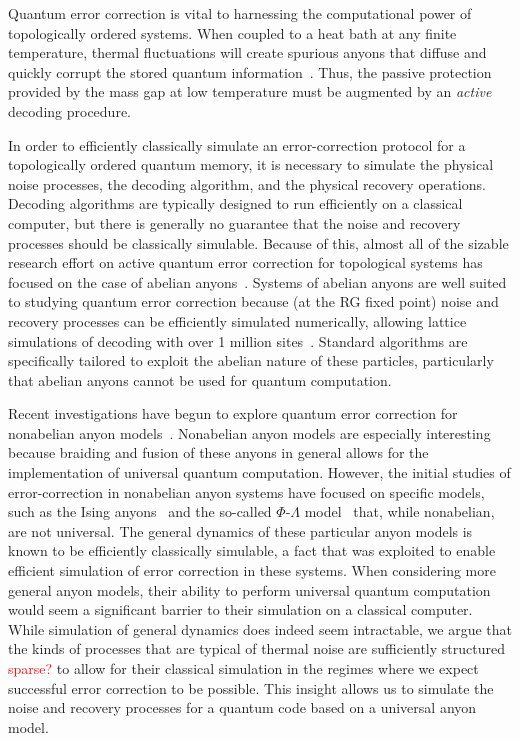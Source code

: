 \documentclass[aps, prl, letterpaper, twocolumn, superscriptaddress, notitlepage, 10pt]{revtex4}
\newcommand{\dude}[1]{\textcolor{red}{#1}}
\begin{document}
Quantum error correction is vital to harnessing the computational power of topologically 
ordered systems. When coupled to a heat bath at any finite temperature, thermal fluctuations 
will create spurious anyons that diffuse and quickly corrupt the stored quantum 
information~\cite{Pastawski2010}. Thus, the passive protection provided by the mass gap 
at low temperature must be augmented by an \emph{active} decoding procedure. 

In order to efficiently classically simulate an error-correction protocol for 
a topologically ordered quantum memory, it is necessary to simulate 
the physical noise processes, the decoding algorithm, and the physical recovery operations. 
Decoding algorithms are typically designed to run efficiently on a 
classical computer, but there is generally no guarantee that the 
noise and recovery processes should be classically simulable.
Because of this, almost all of the sizable research effort 
on active quantum error correction for topological systems has focused 
on the case of abelian anyons~\cite{Dennis2002, Duclos-Cianci2010, Duclos-Cianci2010a, Wang2010, Wang2010a, Duclos-Cianci2013, Bravyi2011, Bombin2012, Wootton2012, Anwar2014, Watson2014, Hutter2014a, Bravyi2014, Wootton2015, Fowler2015, Andrist2015}.
Systems of abelian anyons are well suited to studying quantum 
error correction because (at the RG fixed point) noise and 
recovery processes can be efficiently simulated numerically, allowing lattice simulations 
of decoding with over 1 million sites~\cite{Duclos-Cianci2010}. 
Standard algorithms are specifically tailored to exploit the abelian nature 
of these particles, particularly that abelian anyons cannot be used for quantum computation. 

Recent investigations have begun to explore quantum error correction for nonabelian anyon 
models~\cite{Brell2013, Wootton2013, Hutter2014, Wootton2015b}. Nonabelian anyon models are especially interesting 
because braiding and fusion of these anyons in general allows for the implementation of universal quantum 
computation. However, the initial studies of error-correction in nonabelian anyon systems have focused on specific models, such as the Ising 
anyons~\cite{Brell2013} and the so-called $\Phi$-$\Lambda$ 
model~\cite{Wootton2013, Hutter2014} that, while nonabelian, are not universal. The general dynamics of these particular anyon models is known to be efficiently classically simulable, a fact
that was exploited to enable efficient simulation of error correction 
in these systems. When considering more general anyon models, their 
ability to perform universal quantum computation would seem a significant 
barrier to their simulation on a classical computer. While simulation 
of general dynamics does indeed seem intractable, we argue that 
the kinds of processes that are typical of thermal noise 
are sufficiently structured  \dude{sparse?} to allow for their classical simulation 
in the regimes where we expect successful error correction to 
be possible. This insight allows us to simulate the noise 
and recovery processes for a quantum code based on a universal anyon model.
\end{document}
